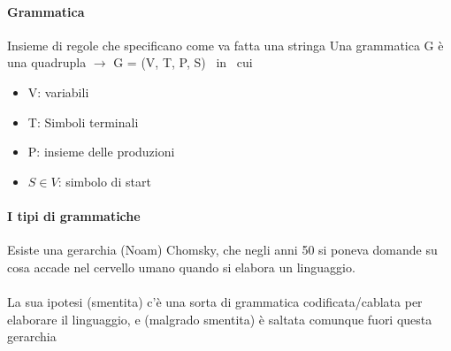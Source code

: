 \documentclass[12pt, a4paper, openany, oneside]{book}
\begin{document}
\paragraph{Grammatica} Insieme di regole che specificano come va fatta una stringa
Una grammatica G è una quadrupla $\to$ G = (V, T, P, S) ~in ~cui~
\begin{itemize}
	\item V: variabili
	\item T: Simboli terminali
	\item P: insieme delle produzioni
	\item $S \in V$: simbolo di start
\end{itemize}
\paragraph{I tipi di grammatiche}
Esiste una gerarchia (Noam) Chomsky, che negli anni 50 si poneva domande su 
cosa accade nel cervello umano quando si elabora un linguaggio. \\ \\
La sua ipotesi (smentita) c'è una sorta di grammatica codificata/cablata
per elaborare il linguaggio, e (malgrado smentita) è saltata comunque fuori 
questa gerarchia
\end{document}
